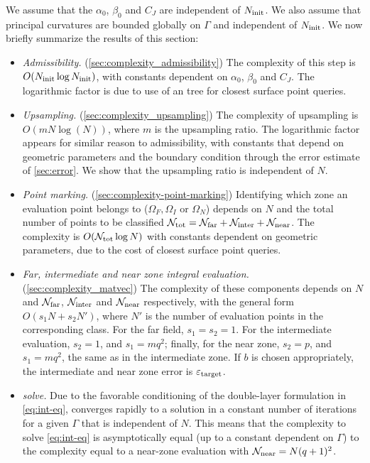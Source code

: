 We assume that the $\alpha_0$, $\beta_0$ and $C_J$ are independent of $N_{\mathrm{init}}$. 
We also assume that principal curvatures are bounded globally on $\Gamma$ and independent of $N_{\mathrm{init}}$. 
We now briefly summarize the results of this section:

\begin{itemize}
\item \emph{Admissibility.} (\cref{sec:complexity_admissibility}) The complexity of this step is $O(N_{\mathrm{init}} \log N_{\mathrm{init}})$,
  with constants dependent on $\alpha_0$, $\beta_0$ and $C_J$. 
  The logarithmic factor is due to use of an \aabb tree for closest surface point queries. 

\item \emph{Upsampling.} (\cref{sec:complexity_upsampling}) The complexity of upsampling is $ O(m  N \log(N))$, where $m$ is the upsampling ratio.
  The logarithmic factor appears for similar reason to admissibility,
  with constants that depend on geometric parameters and the boundary condition through the error estimate of \cref{sec:error}.
  We show that the upsampling ratio is independent of $N$.
  
\item \emph{Point marking.} (\cref{sec:complexity-point-marking}) Identifying which zone an evaluation point belongs to ($\Omega_F, \Omega_I$ or $\Omega_N$) depends on $N$ and the total number of points to be classified $\mathcal{N}_{\mathrm{tot}} = \mathcal{N}_{\mathrm{far}} + \mathcal{N}_{\mathrm{inter}} + \mathcal{N}_{\mathrm{near}}$. 
  The complexity is $O(\mathcal{N}_{\mathrm{tot}} \log N)$ with constants dependent on geometric parameters, due to the cost of closest surface point queries. 
  
\item\emph{ Far, intermediate and near zone integral evaluation.} (\cref{sec:complexity_matvec}) The complexity of these components depends on $N$ and  $\mathcal{N}_{\mathrm{far}}$, $\mathcal{N}_{\mathrm{inter}}$ and $\mathcal{N}_{\mathrm{near}}$ respectively, with the general form $O(s_1 N + s_2 N')$, where $N'$ is the number of evaluation points in the corresponding class.  For the far field, $s_1 = s_2 = 1$.  For the intermediate evaluation,
$s_2 =1$, and $s_1 = m q^2$; finally, for the near zone, $s_2 = p$, and $s_1 = mq^2$, the same as in the intermediate zone.  
If $b$ is chosen appropriately, the intermediate and near zone error is ${\varepsilon_{\mathrm{target}}}$. 

  \item \emph{\gmres solve.} Due to the favorable conditioning of the double-layer formulation in \cref{eq:int-eq}, \gmres converges rapidly to a solution in a constant number of iterations for a given $\Gamma$ that is independent of $N$. 
    This means that the complexity to solve \cref{eq:int-eq} is asymptotically equal (up to a constant dependent on $\Gamma$) to the complexity equal to a near-zone evaluation with $\mathcal{N}_{\mathrm{near}}=N(q+1)^2$. 
\end{itemize}


